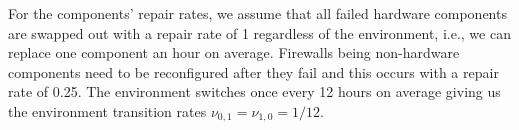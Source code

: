 \documentclass[12pt]{article}
\begin{document}
For the components' repair rates, we assume that all failed hardware
components are swapped out with a repair rate of 1 regardless of the
environment, i.e., we can replace one component an hour on average. Firewalls
being non-hardware components need to be reconfigured after they fail and this
occurs with a repair rate of 0.25. The environment switches
once every 12 hours on average giving us the environment transition
rates $\nu_{0, 1} = \nu_{1, 0} = 1 / 12$.



\end{document}
